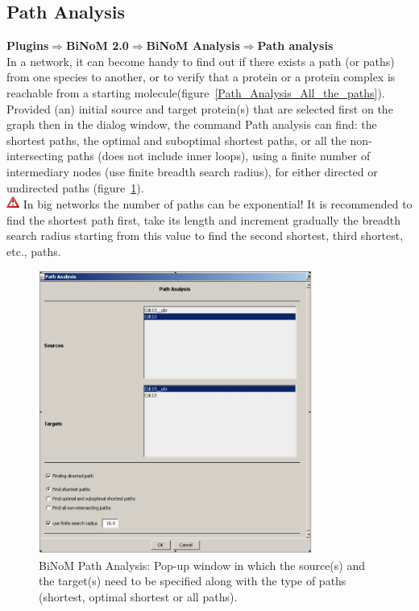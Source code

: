 \subsection{Path Analysis}\label{Path_Analysis}
\textbf{Plugins$\Rightarrow$BiNoM 2.0$\Rightarrow$BiNoM Analysis$\Rightarrow$Path analysis}\\
In a network, it can become handy to find out if there exists a path (or paths) from one species to another, or to verify that a protein or a protein complex is reachable from a starting molecule(figure~\ref{Path_Analysis_All_the_paths}). Provided (an) initial source and target protein(s) that are selected first on the graph then in the dialog window, the command Path analysis can find: the shortest paths, the optimal and suboptimal shortest paths, or all the non-intersecting paths (does not include inner loops), using a finite number of intermediary nodes (use finite breadth search radius), for either directed or undirected paths (figure~\ref{Path_Analysis_Pop-up_window}).\\
\includegraphics[width=12pt,height=12pt]{graphics/warning} In big networks the number of paths can be exponential! It is recommended to find the shortest path first, take its length and increment gradually the breadth search radius starting from this value to find the second shortest, third shortest, etc., paths.\\
\begin{figure}
\centering
\includegraphics[width=0.8\textwidth]{graphics/Path_Analysis_Pop-up_window}
\caption{BiNoM Path Analysis: Pop-up window in which the source(s) and the target(s) need to be specified along with the type of paths (shortest, optimal shortest or all paths).}
\label{Path_Analysis_Pop-up_window}
\end{figure}
